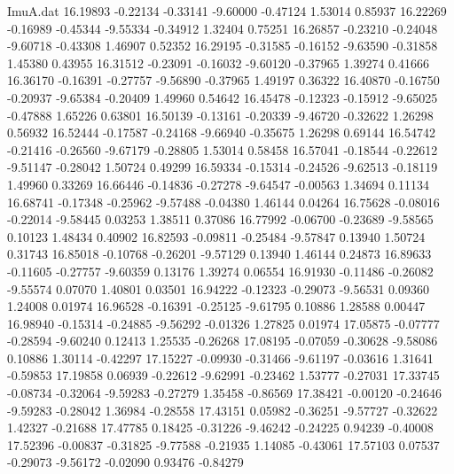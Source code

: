 \begin{filecontents}{ImuA.dat}
  16.19893   -0.22134   -0.33141   -9.60000   -0.47124    1.53014    0.85937
  16.22269   -0.16989   -0.45344   -9.55334   -0.34912    1.32404    0.75251
  16.26857   -0.23210   -0.24048   -9.60718   -0.43308    1.46907    0.52352
  16.29195   -0.31585   -0.16152   -9.63590   -0.31858    1.45380    0.43955
  16.31512   -0.23091   -0.16032   -9.60120   -0.37965    1.39274    0.41666
  16.36170   -0.16391   -0.27757   -9.56890   -0.37965    1.49197    0.36322
  16.40870   -0.16750   -0.20937   -9.65384   -0.20409    1.49960    0.54642
  16.45478   -0.12323   -0.15912   -9.65025   -0.47888    1.65226    0.63801
  16.50139   -0.13161   -0.20339   -9.46720   -0.32622    1.26298    0.56932
  16.52444   -0.17587   -0.24168   -9.66940   -0.35675    1.26298    0.69144
  16.54742   -0.21416   -0.26560   -9.67179   -0.28805    1.53014    0.58458
  16.57041   -0.18544   -0.22612   -9.51147   -0.28042    1.50724    0.49299
  16.59334   -0.15314   -0.24526   -9.62513   -0.18119    1.49960    0.33269
  16.66446   -0.14836   -0.27278   -9.64547   -0.00563    1.34694    0.11134
  16.68741   -0.17348   -0.25962   -9.57488   -0.04380    1.46144    0.04264
  16.75628   -0.08016   -0.22014   -9.58445    0.03253    1.38511    0.37086
  16.77992   -0.06700   -0.23689   -9.58565    0.10123    1.48434    0.40902
  16.82593   -0.09811   -0.25484   -9.57847    0.13940    1.50724    0.31743
  16.85018   -0.10768   -0.26201   -9.57129    0.13940    1.46144    0.24873
  16.89633   -0.11605   -0.27757   -9.60359    0.13176    1.39274    0.06554
  16.91930   -0.11486   -0.26082   -9.55574    0.07070    1.40801    0.03501
  16.94222   -0.12323   -0.29073   -9.56531    0.09360    1.24008    0.01974
  16.96528   -0.16391   -0.25125   -9.61795    0.10886    1.28588    0.00447
  16.98940   -0.15314   -0.24885   -9.56292   -0.01326    1.27825    0.01974
  17.05875   -0.07777   -0.28594   -9.60240    0.12413    1.25535   -0.26268
  17.08195   -0.07059   -0.30628   -9.58086    0.10886    1.30114   -0.42297
  17.15227   -0.09930   -0.31466   -9.61197   -0.03616    1.31641   -0.59853
  17.19858    0.06939   -0.22612   -9.62991   -0.23462    1.53777   -0.27031
  17.33745   -0.08734   -0.32064   -9.59283   -0.27279    1.35458   -0.86569
  17.38421   -0.00120   -0.24646   -9.59283   -0.28042    1.36984   -0.28558
  17.43151    0.05982   -0.36251   -9.57727   -0.32622    1.42327   -0.21688
  17.47785    0.18425   -0.31226   -9.46242   -0.24225    0.94239   -0.40008
  17.52396   -0.00837   -0.31825   -9.77588   -0.21935    1.14085   -0.43061
  17.57103    0.07537   -0.29073   -9.56172   -0.02090    0.93476   -0.84279

\end{filecontents}
